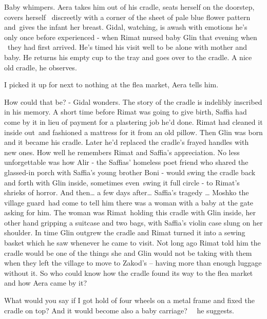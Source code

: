 \documentclass[letterpaper]{article}
\begin{document}
Baby whimpers. Aera takes him out of his cradle, seats herself on the doorstep, covers herself
\textcolor[rgb]{0.0,0.4392157,0.7529412}{\ }discreetly\textcolor[rgb]{0.0,0.4392157,0.7529412}{ }with a corner of the
sheet of pale blue flower pattern and~gives the infant her breast. Gidal, watching, is awash with
emotions\textcolor{red}{ }he's only once before experienced - when Rimat nursed baby Glin that evening when \ they had
first arrived. He's timed his visit well to be alone with mother and baby. He returns his empty cup to the tray and
goes over to the cradle. {\textquotedbl}A nice old cradle,{\textquotedbl} he
observes\textcolor[rgb]{0.0,0.4392157,0.7529412}{.}

{\textquotedbl}I picked it up for next to nothing at the flea market,{\textquotedbl} Aera tells
him\textcolor[rgb]{0.0,0.4392157,0.7529412}{.}

How could that be? - Gidal wonders. The story of the cradle is indelibly inscribed in his memory. A short time before
Rimat was going to give birth, Saffia had come by it in lieu of payment for a plastering
job\textcolor[rgb]{0.0,0.4392157,0.7529412}{ }he'd done. Rimat had cleaned it inside out~and fashioned a mattress for
it from an old pillow. Then Glin was born and it became his cradle. Later he'd replaced the cradle's frayed handles
with new ones. How well he remembers Rimat and Saffia's appreciation. No less unforgettable was how Alir - the Saffias'
homeless poet friend who shared the glassed-in porch with Saffia's young brother Boni - would swing the cradle back and
forth with Glin inside, sometimes even~swing it full circle - to Rimat's shrieks of horror. And then{\dots} a few days
after{\dots} Saffia's tragedy {\dots} Moshko the village guard~had come to tell him there was a woman with a baby at
the gate asking for him. The woman was Rimat~holding this cradle with Glin inside, her other hand gripping a suitcase
and two bags, with\textcolor[rgb]{0.0,0.4392157,0.7529412}{ }Saffia's violin case slung on her shoulder. In time Glin
outgrew the cradle and Rimat turned it into a sewing basket which he saw whenever he came to visit. Not long ago Rimat
told him the cradle would be one of the things she and Glin would not be taking with them when they left the village to
move to Zakod's \textcolor[rgb]{0.0,0.4392157,0.7529412}{{}--} having more than enough luggage without it. So who could
know how the cradle found its way to the flea market and how Aera came by it?

{\textquotedbl}What would you say if I got hold of four wheels on a metal frame and fixed the cradle on top? And it
would become also a baby carriage?{\textquotedbl} \ \ he suggests.
\end{document}
